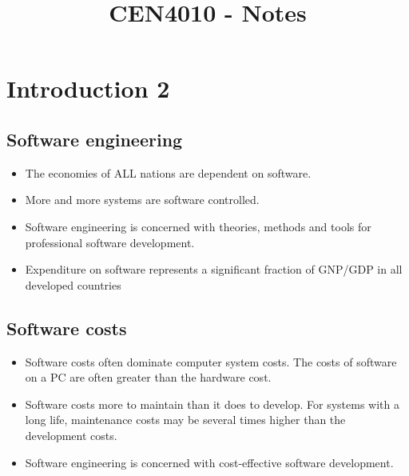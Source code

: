 \documentclass{report}
\title{\textbf{CEN4010 - Notes}}
\author{}
\date{}
\begin{document}
\maketitle
\tableofcontents
\newpage

\chapter{Introduction 2}
\section{Software engineering}
\begin{itemize}
  \setlength\itemsep{-.25em}
  \item The economies of ALL nations are dependent on software.
  \item More and more systems are software controlled.
  \item Software engineering is concerned with theories, methods and tools for professional software development.
  \item Expenditure on software represents a significant fraction of GNP/GDP in all developed countries
\end{itemize}

\section{Software costs}
\begin{itemize}
  \setlength\itemsep{-.25em}
  \item Software costs often dominate computer system costs. The costs of software on a PC are often greater than the hardware cost.
  \item Software costs more to maintain than it does to develop. For systems with a long life, maintenance costs may be several times higher than the development costs.
  \item Software engineering is concerned with cost-effective software development.
\end{itemize}
\end{document}
